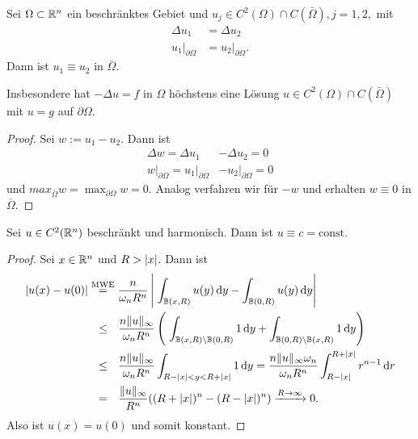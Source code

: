 \begin{kor}[Identitätssatz]
  \label{kor:4.14}
  Sei $\Omega\subset\mathbb{R}^n$ ein beschränktes Gebiet und $u_j\in C^2(\Omega)\cap C(\bar\Omega), j = 1,2,$ mit
  \begin{align*}
    \Delta u_1&=\Delta u_2 \\
    u_1\rvert_{\partial\Omega}&=u_2\rvert_{\partial\Omega}.
  \end{align*}
  Dann ist $u_1\equiv u_2$ in $\bar\Omega$.

  Insbesondere hat $-\Delta u=f$ in $\Omega$ höchstens eine Lösung $u\in C^2(\Omega)\cap C(\bar\Omega)$ mit $u=g$ auf $\partial\Omega$.
\end{kor}

\begin{proof}
  Sei $w:=u_1-u_2$. Dann ist 
  \begin{align*}
    \Delta w=\Delta u_1&-\Delta u_2=0 \\
    w\rvert_{\partial\Omega}=u_1\rvert_{\partial\Omega}&-u_2\rvert_{\partial\Omega} = 0
  \end{align*}
  und $max_{\bar\Omega}w=\max_{\partial\Omega}w=0$. Analog verfahren wir für $-w$ und erhalten $w\equiv 0$ in $\bar\Omega$.
\end{proof}

\begin{satz}[Liouville]
  \label{satz:4.15}
  Sei $u\in C^2(\mathbb{R}^n)$ beschränkt und harmonisch. Dann ist $u\equiv c= \text{const}$.
\end{satz}

\begin{proof}
  Sei $x\in\mathbb{R}^n$ und $R>\lvert x\rvert$. Dann ist
  \[
  \begin{split}
    \lvert u(x)-u(0)\rvert&\overset{\scriptsize\text{MWE}}=\frac{n}{\omega_nR^n}\left\lvert \;\int_{\mathbb{B}(x,R)}u(y)\,\mathrm{d} y-\int_{\mathbb{B}(0,R)}u(y)\,\mathrm{d} y\right\rvert \\
    &\ \ \leq\ \  \frac{n\lVert u\rVert_\infty}{\omega_nR^n}\left(
      \;\int_{\mathbb{B}(x,R)\setminus\mathbb{B}(0,R)}1\,\mathrm{d} y+\int_{\mathbb{B}(0,R)\setminus\mathbb{B}(x,R)}1\,\mathrm{d} y
    \right)\\
    &\ \ \leq\ \  \frac{n\lVert u\rVert_\infty}{\omega_nR^n} \int_{R-\lvert x\rvert< y<R+\lvert x\rvert}1\,\mathrm{d} y
    =\frac{n\lVert u\rVert_\infty\omega_n}{\omega_nR^n} \int_{R-\lvert x\rvert}^{R+\lvert x\rvert}r^{n-1}\,\mathrm{d} r \\
    &\ \ =\ \ \frac{\lVert u\rVert_\infty}{R^n}((R+\lvert x\rvert)^n-(R-\lvert x\rvert)^n)\xrightarrow{R\rightarrow\infty}0.
  \end{split}
  \]
  Also ist $u(x)=u(0)$ und somit konstant.
\end{proof}

